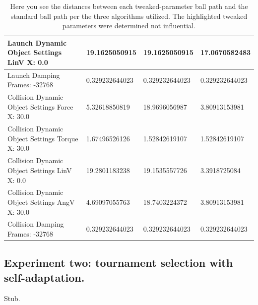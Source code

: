 \begin{table}[htbp]
\begin{tabular}{ | l || l | l | l | }
Launch Dynamic Object Settings LinV X: 0.0 & 19.1625050915  & 19.1625050915  & 17.0670582483 \\ \hline
\rowcolor{cyan}
Launch Damping Frames: -32768 & 0.329232644023 & 0.329232644023  & 0.329232644023 \\ \hline
Collision Dynamic Object Settings Force X: 30.0 & 5.32618850819  & 18.9696056987  & 3.80913153981 \\ \hline
Collision Dynamic Object Settings Torque X: 30.0 & 1.67496526126  & 1.52842619107  & 1.52842619107 \\ \hline
Collision Dynamic Object Settings LinV X: 0.0 & 19.2801183238  & 19.1535557726  & 3.3918725084 \\ \hline
Collision Dynamic Object Settings AngV X: 30.0 & 4.69097055763 & 18.7403224372 & 3.80913153981 \\ \hline
\rowcolor{cyan}
Collision Damping Frames: -32768 & 0.329232644023 & 0.329232644023 & 0.329232644023 \\ \hline
\end{tabular}
\caption[Physics Engine Parameter Influences]{Here you see the distances between each tweaked-parameter ball path and the standard ball path per the three algorithms utilized. The highlighted tweaked parameters were determined not influential.}
\label{tab:distances}
\end{table}

\subsection[Experiment Two]{Experiment two: tournament selection with self-adaptation.}

Stub.
